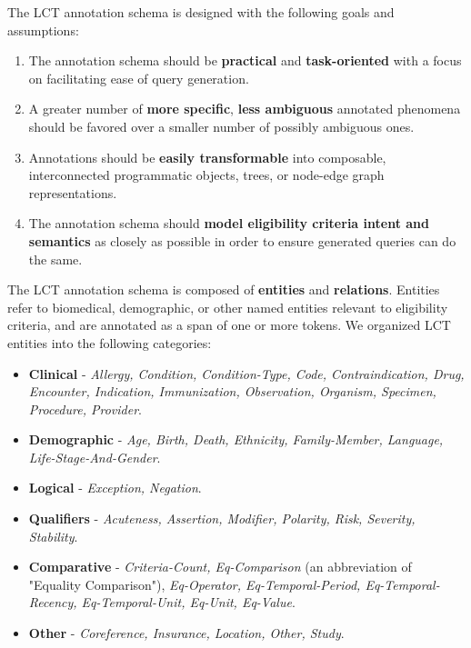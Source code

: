 \documentclass[../main.tex]{subfiles}
\begin{document}
The LCT annotation schema is designed with the following goals and assumptions:

\begin{enumerate}
    \item The annotation schema should be \textbf{practical} and  \textbf{task-oriented} with a focus on facilitating ease of query generation. 
    \item A greater number of \textbf{more specific}, \textbf{less ambiguous} annotated phenomena should be favored over a smaller number of possibly ambiguous ones.
    \item Annotations should be \textbf{easily transformable} into composable, interconnected programmatic objects, trees, or node-edge graph representations.
    \item The annotation schema should \textbf{model eligibility criteria intent and semantics} as closely as possible in order to ensure generated queries can do the same.
\end{enumerate}

The LCT annotation schema is composed of \textbf{entities} and 
\textbf{relations}. Entities refer to biomedical, demographic, or other named entities relevant to eligibility criteria, and are annotated as a span of one or more tokens. We organized LCT entities into the following categories:

\begin{itemize}
    \item \textbf{Clinical} - \textit{Allergy, Condition, Condition-Type, Code, Contraindication, Drug, Encounter, Indication, Immunization, Observation, Organism, Specimen, Procedure, Provider}. %
    \item \textbf{Demographic} - \textit{Age, Birth, Death, Ethnicity, Family-Member, Language, Life-Stage-And-Gender}. %
    \item \textbf{Logical} - \textit{Exception, Negation}. %
    \item \textbf{Qualifiers} - \textit{Acuteness, Assertion, Modifier, Polarity, Risk, Severity, Stability}. %
    \item \textbf{Comparative} - \textit{Criteria-Count, Eq-Comparison} (an abbreviation of "Equality Comparison"), \textit{Eq-Operator, Eq-Temporal-Period, Eq-Temporal-Recency, Eq-Temporal-Unit, Eq-Unit, Eq-Value}. %
    \item \textbf{Other} - \textit{Coreference, Insurance, Location, Other, Study}. %
\end{itemize}
\end{document}

